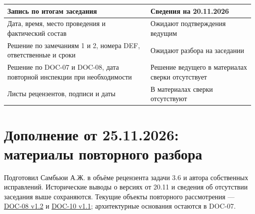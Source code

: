 \documentclass[12pt,a4paper]{article}
\newcounter{none} %
\begin{document}
{\def\LTcaptype{none} %
\begin{longtable}[]{@{}
  >{\raggedright\arraybackslash}p{}
  >{\raggedright\arraybackslash}p{}@{}}
\toprule\noalign{}
\begin{minipage}[b]{\linewidth}\raggedright
Запись по итогам заседания
\end{minipage} & \begin{minipage}[b]{\linewidth}\raggedright
Сведения на 20.11.2026
\end{minipage} \\
\midrule\noalign{}
\endhead
\bottomrule\noalign{}
\endlastfoot
Дата, время, место проведения и фактический состав & Ожидают подтверждения ведущим \\
Решение по замечаниям 1 и 2, номера DEF, ответственные и сроки & Ожидают разбора на заседании \\
Решение по DOC-07 и DOC-08, дата повторной инспекции при необходимости & Решение ведущего в материалах сверки отсутствует \\
Листы рецензентов, подписи и даты & В материалах сверки отсутствуют \\
\end{longtable}
}

\section{Дополнение от 25.11.2026: материалы повторного разбора}\label{ux434ux43eux43fux43eux43bux43dux435ux43dux438ux435-ux43eux442-25112026-ux43cux430ux442ux435ux440ux438ux430ux43bux44b-ux43fux43eux432ux442ux43eux440ux43dux43eux433ux43e-ux440ux430ux437ux431ux43eux440ux430}

\hypertarget{дополнение-от-25112026-материалы-повторного-разбора}{}

Подготовил Самбьюи А.Ж. в объёме рецензента задачи 3.6 и автора собственных исправлений. Исторические выводы о версиях от 20.11 и сведения об отсутствии заседания выше сохраняются. Текущие объекты повторного рассмотрения --- {\href{../09\_Архитектура\_и\_API/DOC-08\_Справочник\_API.pdf\#doc-08-справочник-api-платформы}{DOC-08 v1.2}} и {\href{../10\_Верификация\_и\_тестирование/DOC-10\_План\_верификации.pdf\#doc-10-план-верификации-программного-обеспечения}{DOC-10 v1.1}}; архитектурные основания остаются в DOC-07.
\end{document}
